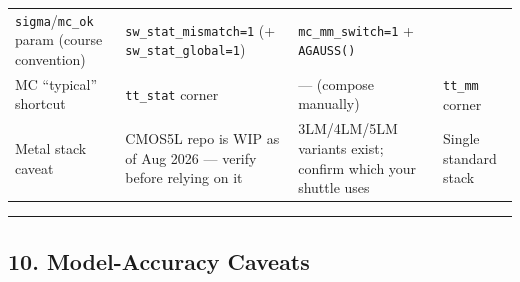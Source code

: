 \documentclass[
]{article}
\begin{document}
\begin{longtable}[]{@{}llll@{}}
\begin{minipage}[t]{0.22\columnwidth}
\texttt{sigma}/\texttt{mc\_ok} param (course convention)\strut
\end{minipage} & \begin{minipage}[t]{0.22\columnwidth}\raggedright
\texttt{sw\_stat\_mismatch=1} (+ \texttt{sw\_stat\_global=1})\strut
\end{minipage} & \begin{minipage}[t]{0.22\columnwidth}\raggedright
\texttt{mc\_mm\_switch=1} + \texttt{AGAUSS()}\strut
\end{minipage}\tabularnewline
\begin{minipage}[t]{0.22\columnwidth}\raggedright
MC ``typical'' shortcut\strut
\end{minipage} & \begin{minipage}[t]{0.22\columnwidth}\raggedright
\texttt{tt\_stat} corner\strut
\end{minipage} & \begin{minipage}[t]{0.22\columnwidth}\raggedright
--- (compose manually)\strut
\end{minipage} & \begin{minipage}[t]{0.22\columnwidth}\raggedright
\texttt{tt\_mm} corner\strut
\end{minipage}\tabularnewline
\begin{minipage}[t]{0.22\columnwidth}\raggedright
Metal stack caveat\strut
\end{minipage} & \begin{minipage}[t]{0.22\columnwidth}\raggedright
CMOS5L repo is WIP as of Aug 2026 --- verify before relying on it\strut
\end{minipage} & \begin{minipage}[t]{0.22\columnwidth}\raggedright
3LM/4LM/5LM variants exist; confirm which your shuttle uses\strut
\end{minipage} & \begin{minipage}[t]{0.22\columnwidth}\raggedright
Single standard stack\strut
\end{minipage}\tabularnewline
\bottomrule
\end{longtable}

\begin{center}\rule{0.5\linewidth}{0.5pt}\end{center}

\hypertarget{model-accuracy-caveats}{%
\subsection{10. Model-Accuracy Caveats}\label{model-accuracy-caveats}}
\end{document}
